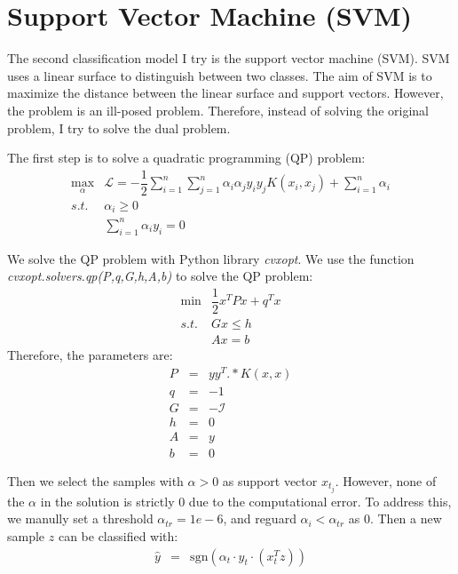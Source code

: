 \section{Support Vector Machine (SVM)}
\label{sec:svm}

The second classification model I try is the support vector machine (SVM).
SVM uses a linear surface to distinguish between two classes.
The aim of SVM is to maximize the distance between the linear surface and support vectors.
However, the problem is an ill-posed problem.
Therefore, instead of solving the original problem, I try to solve the dual problem.

The first step is to solve a quadratic programming (QP) problem:
\begin{eqnarray}
    \max_\alpha & \mathcal{L} = -\dfrac{1}{2}\sum_{i=1}^{n}\sum_{j=1}^{n}\alpha_i\alpha_jy_iy_jK\left(x_i, x_j\right) + \sum_{i=1}^{n}\alpha_i \\
    s.t. & \alpha_i \geqslant 0 \\
     & \sum_{i=1}^{n} \alpha_iy_i = 0
    \label{eqn:svm-qp}
\end{eqnarray}

We solve the QP problem with Python library \textit{cvxopt}.
We use the function \textit{cvxopt.solvers.qp(P,q,G,h,A,b)} to solve the QP problem:
\begin{eqnarray}
    \min & \dfrac{1}{2} x^TPx + q^T x \\
    s.t. & Gx \leqslant h \\
     & Ax = b
\end{eqnarray}
Therefore, the parameters are:
\begin{eqnarray}
    P & = & y y^T .* K(x,x) \\
    q & = & -1 \\
    G & = & - \mathcal{I} \\
    h & = & 0 \\
    A & = & y \\ 
    b & = & 0
\end{eqnarray}


Then we select the samples with $\alpha>0$ as support vector $x_{t_j}$.
However, none of the $\alpha$ in the solution is strictly 0 due to the computational error.
To address this, we manully set a threshold $\alpha_{tr}=1e-6$, and reguard $\alpha_i<\alpha_{tr}$ as 0.
Then a new sample $z$ can be classified with:
\begin{eqnarray}
    \hat{y} & = & \mathrm{sgn}\left(\alpha_t\cdot y_t\cdot \left(x_t^Tz\right)\right)
    \label{eqn:svm-pred}
\end{eqnarray}


